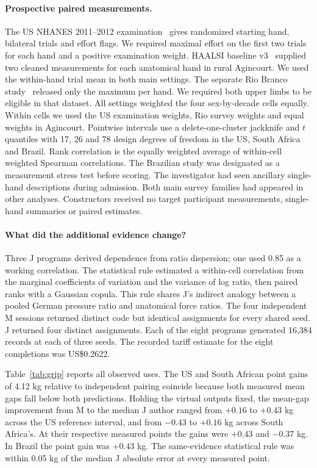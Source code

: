 \paragraph{Prospective paired measurements.}
The US NHANES 2011--2012 examination~\cite{grip_cdc} gives randomized starting hand, bilateral trials and effort flags. We required maximal effort on the first two trials for each hand and a positive examination weight. HAALSI baseline v3~\cite{grip_haalsi} supplied two cleaned measurements for each anatomical hand in rural Agincourt. We used the within-hand trial mean in both main settings. The separate Rio Branco study~\cite{grip_rio} released only the maximum per hand. We required both upper limbs to be eligible in that dataset. All settings weighted the four sex-by-decade cells equally. Within cells we used the US examination weights, Rio survey weights and equal weights in Agincourt. Pointwise intervals use a delete-one-cluster jackknife and $t$ quantiles with 17, 26 and 78 design degrees of freedom in the US, South Africa and Brazil. Rank correlation is the equally weighted average of within-cell weighted Spearman correlations. The Brazilian study was designated as a measurement stress test before scoring. The investigator had seen ancillary single-hand descriptions during admission. Both main survey families had appeared in other analyses. Constructors received no target participant measurements, single-hand summaries or paired estimates.

\paragraph{What did the additional evidence change?}
Three J programs derived dependence from ratio dispersion; one used 0.85 as a working correlation. The statistical rule estimated a within-cell correlation from the marginal coefficients of variation and the variance of log ratio, then paired ranks with a Gaussian copula. This rule shares J's indirect analogy between a pooled German pressure ratio and anatomical force ratios. The four independent M sessions returned distinct code but identical assignments for every shared seed. J returned four distinct assignments. Each of the eight programs generated 16,384 records at each of three seeds. The recorded tariff estimate for the eight completions was US\$0.2622.

Table~\ref{tab:grip} reports all observed uses. The US and South African point gains of 4.12 kg relative to independent pairing coincide because both measured mean gaps fall below both predictions. Holding the virtual outputs fixed, the mean-gap improvement from M to the median J author ranged from $+0.16$ to $+0.43$ kg across the US reference interval, and from $-0.43$ to $+0.16$ kg across South Africa's. At their respective measured points the gains were $+0.43$ and $-0.37$ kg. In Brazil the point gain was $+0.43$ kg. The same-evidence statistical rule was within 0.05 kg of the median J absolute error at every measured point.

